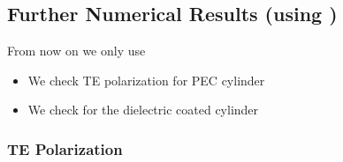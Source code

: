 
\subsection{Further Numerical Results (using {\GreenD})}
  
  \begin{frame}[plain]
    From now on we only use {\GreenD}
    \begin{itemize}
    \item We check TE polarization for PEC cylinder
    \item We check for the dielectric coated  cylinder 
    \end{itemize}
  \end{frame}
  
  \subsubsection{TE Polarization}
  
